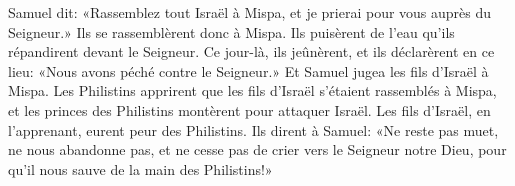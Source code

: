 Samuel dit: «Rassemblez tout Israël à Mispa,
	et je prierai pour vous auprès du Seigneur.»
Ils se rassemblèrent donc à Mispa.
	Ils puisèrent de l’eau qu’ils répandirent devant le Seigneur.
Ce jour-là, ils jeûnèrent, et ils déclarèrent en ce lieu:
	«Nous avons péché contre le Seigneur.»
Et Samuel jugea les fils d’Israël à Mispa.
Les Philistins apprirent que les fils d’Israël s’étaient rassemblés à Mispa,
	et les princes des Philistins montèrent pour attaquer Israël.
Les fils d’Israël, en l’apprenant, eurent peur des Philistins.
Ils dirent à Samuel: «Ne reste pas muet, ne nous abandonne pas,
	et ne cesse pas de crier vers le Seigneur notre Dieu,
	pour qu’il nous sauve de la main des Philistins!»
